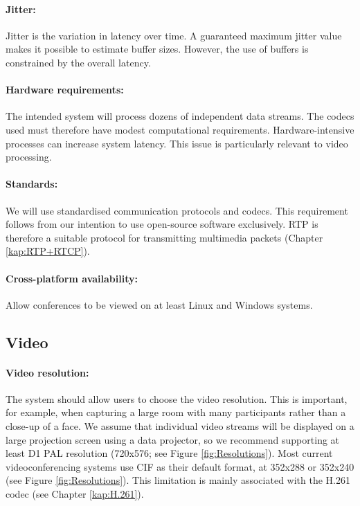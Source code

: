 \paragraph*{Jitter:}
Jitter is the variation in latency over time. A guaranteed maximum jitter value makes it possible to estimate buffer sizes. However, the use of buffers is constrained by the overall latency.

\paragraph*{Hardware requirements:}
The intended system will process dozens of independent data streams. The codecs used must therefore have modest computational requirements. Hardware-intensive processes can increase system latency. This issue is particularly relevant to video processing.

\paragraph*{Standards:}
We will use standardised communication protocols and codecs. This requirement follows from our intention to use open-source software exclusively. RTP is therefore a suitable protocol for transmitting multimedia packets (Chapter \ref{kap:RTP+RTCP}).

\paragraph*{Cross-platform availability:}
Allow conferences to be viewed on at least Linux and Windows systems.

\subsection{Video}

\paragraph*{Video resolution:}
The system should allow users to choose the video resolution. This is important, for example, when capturing a large room with many participants rather than a close-up of a face. We assume that individual video streams will be displayed on a large projection screen using a data projector, so we recommend supporting at least D1 PAL resolution (720x576; see Figure \ref{fig:Resolutions}). Most current videoconferencing systems use CIF as their default format, at 352x288 or 352x240 (see Figure \ref{fig:Resolutions}). This limitation is mainly associated with the H.261 codec (see Chapter \ref{kap:H.261}).

